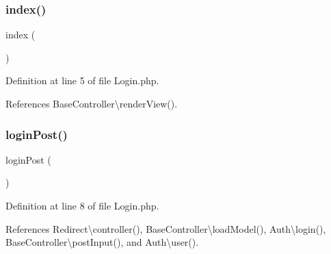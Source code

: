 \subsubsection{\texorpdfstring{index()}{index()}}
{\footnotesize\ttfamily index (\begin{DoxyParamCaption}{ }\end{DoxyParamCaption})}



Definition at line 5 of file Login.\+php.



References Base\+Controller\textbackslash{}render\+View().


\hypertarget{class_login_a94f6c4408a4c944655e54b36a33ae4b9}{}\label{class_login_a94f6c4408a4c944655e54b36a33ae4b9} 
\subsubsection{\texorpdfstring{login\+Post()}{loginPost()}}
{\footnotesize\ttfamily login\+Post (\begin{DoxyParamCaption}{ }\end{DoxyParamCaption})}



Definition at line 8 of file Login.\+php.



References Redirect\textbackslash{}controller(), Base\+Controller\textbackslash{}load\+Model(), Auth\textbackslash{}login(), Base\+Controller\textbackslash{}post\+Input(), and Auth\textbackslash{}user().


